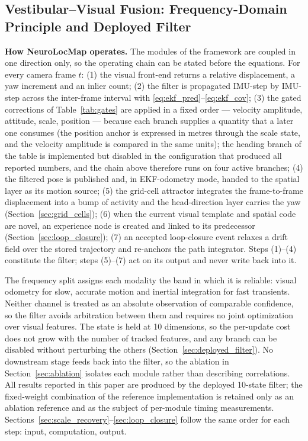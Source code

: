 \subsection{Vestibular--Visual Fusion: Frequency-Domain Principle and Deployed Filter}
\label{sec:fusion}

\textbf{How NeuroLocMap operates.} The modules of the framework are coupled in one direction only, so the operating chain can be stated before the equations. For every camera frame $t$: (1) the visual front-end returns a relative displacement, a yaw increment and an inlier count; (2) the filter is propagated IMU-step by IMU-step across the inter-frame interval with \eqref{eq:ekf_pred}--\eqref{eq:ekf_cov}; (3) the gated corrections of Table~\ref{tab:gates} are applied in a fixed order --- velocity amplitude, attitude, scale, position --- because each branch supplies a quantity that a later one consumes (the position anchor is expressed in metres through the scale state, and the velocity amplitude is compared in the same units); the heading branch of the table is implemented but disabled in the configuration that produced all reported numbers, and the chain above therefore runs on four active branches; (4) the filtered pose is published and, in EKF-odometry mode, handed to the spatial layer as its motion source; (5) the grid-cell attractor integrates the frame-to-frame displacement into a bump of activity and the head-direction layer carries the yaw (Section~\ref{sec:grid_cells}); (6) when the current visual template and spatial code are novel, an experience node is created and linked to its predecessor (Section~\ref{sec:loop_closure}); (7) an accepted loop-closure event relaxes a drift field over the stored trajectory and re-anchors the path integrator. Steps (1)--(4) constitute the filter; steps (5)--(7) act on its output and never write back into it.

The frequency split assigns each modality the band in which it is reliable: visual odometry for slow, accurate motion and inertial integration for fast transients. Neither channel is treated as an absolute observation of comparable confidence, so the filter avoids arbitration between them and requires no joint optimization over visual features. The state is held at 10 dimensions, so the per-update cost does not grow with the number of tracked features, and any branch can be disabled without perturbing the others (Section~\ref{sec:deployed_filter}). No downstream stage feeds back into the filter, so the ablation in Section~\ref{sec:ablation} isolates each module rather than describing correlations. All results reported in this paper are produced by the deployed 10-state filter; the fixed-weight combination of the reference implementation is retained only as an ablation reference and as the subject of per-module timing measurements. Sections~\ref{sec:scale_recovery}--\ref{sec:loop_closure} follow the same order for each step: input, computation, output.

